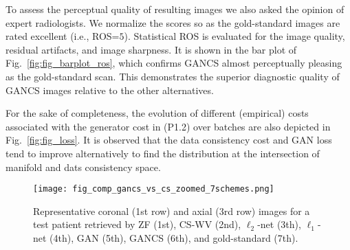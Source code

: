 \documentclass{journal}
\begin{document}


To assess the perceptual quality of resulting images we also asked the opinion of expert radiologists. We normalize the scores so as the gold-standard images are rated excellent (i.e., ROS=$5$). Statistical ROS is evaluated for the image quality, residual artifacts, and image sharpness. It is shown in the bar plot of Fig.~\ref{fig:fig_barplot_ros}, which confirms GANCS almost perceptually pleasing as the gold-standard scan. This demonstrates the superior diagnostic quality of GANCS images relative to the other alternatives. 


For the sake of completeness, the evolution of different (empirical) costs associated with the generator cost in (P1.2) over batches are also depicted in Fig.~\ref{fig:fig_loss}. It is observed that the data consistency cost and GAN loss tend to improve alternatively to find the distribution at the intersection of manifold and dats consistency space. 









\begin{figure}[t]
	\hspace{-1.85cm}\texttt{[image: fig\_comp\_gancs\_vs\_cs\_zoomed\_7schemes.png]}
	\caption{Representative coronal (1st row) and axial (3rd row) images for a test patient retrieved by ZF (1st), CS-WV (2nd), $\ell_2$-net (3th), $\ell_1$-net (4th), GAN (5th), GANCS (6th), and gold-standard (7th). }
	\label{fig:fig_recon_gancs_vs_cs_mse_4fold}
\end{figure}
\end{document}
